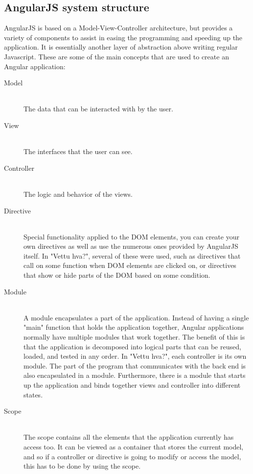 \subsection{AngularJS system structure}

AngularJS is based on a Model-View-Controller architecture, but provides a variety of components to assist in easing the programming and speeding up the application. It is essentially another layer of abstraction above writing regular Javascript. These are some of the main concepts that are used to create an Angular application:

\begin{description}
	\item[Model] \hfill \\ 
	The data that can be interacted with by the user.
	
	\item[View] \hfill \\ 
	The interfaces that the user can see.
	
	\item[Controller] \hfill \\ 
	The logic and behavior of the views.
	
	\item[Directive] \hfill \\ 
	Special functionality applied to the DOM elements, you can create your own directives as well as use the numerous ones provided by AngularJS itself. In "Vettu hva?", several of these were used, such as directives that call on some function when DOM elements are clicked on, or directives that show or hide parts of the DOM based on some condition.
	
	\item[Module] \hfill \\ 
	A module encapsulates a part of the application. Instead of having a single "main" function that holds the application together, Angular applications normally have multiple modules that work together. The benefit of this is that the application is decomposed into logical parts that can be reused, loaded, and tested in any order. In "Vettu hva?", each controller is its own module. The part of the program that communicates with the back end is also encapsulated in a module. Furthermore, there is a module that starts up the application and binds together views and controller into different states.
	
	\item[Scope] \hfill \\ 
	The scope contains all the elements that the application currently has access too. It can be viewed as a container that stores the current model, and so if a controller or directive is going to modify or access the model, this has to be done by using the scope.
	

\end{description}
